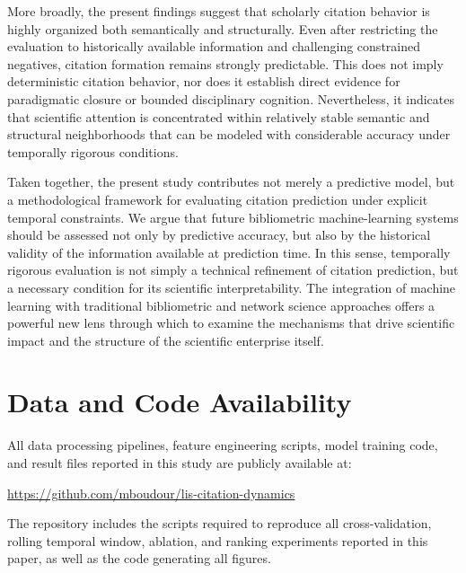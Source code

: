 \documentclass[11pt,a4paper]{article}
\begin{document}
More broadly, the present findings suggest that scholarly citation behavior is highly organized both semantically and structurally. Even after restricting the evaluation to historically available information and challenging constrained negatives, citation formation remains strongly predictable. This does not imply deterministic citation behavior, nor does it establish direct evidence for paradigmatic closure or bounded disciplinary cognition. Nevertheless, it indicates that scientific attention is concentrated within relatively stable semantic and structural neighborhoods that can be modeled with considerable accuracy under temporally rigorous conditions.

Taken together, the present study contributes not merely a predictive model, but a methodological framework for evaluating citation prediction under explicit temporal constraints. We argue that future bibliometric machine-learning systems should be assessed not only by predictive accuracy, but also by the historical validity of the information available at prediction time. In this sense, temporally rigorous evaluation is not simply a technical refinement of citation prediction, but a necessary condition for its scientific interpretability. The integration of machine learning with traditional bibliometric and network science approaches offers a powerful new lens through which to examine the mechanisms that drive scientific impact and the structure of the scientific enterprise itself.

\section*{Data and Code Availability}
All data processing pipelines, feature engineering scripts, model training
code, and result files reported in this study are publicly available at:
\begin{center}
\url{https://github.com/mboudour/lis-citation-dynamics}
\end{center}
The repository includes the scripts required to reproduce all
cross-validation, rolling temporal window, ablation, and ranking
experiments reported in this paper, as well as the code generating
all figures.



\end{document}
